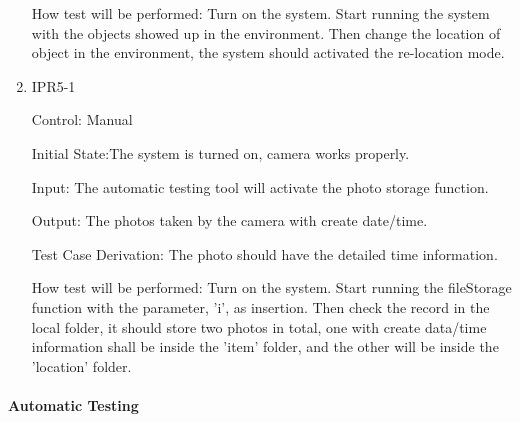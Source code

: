 \documentclass[12pt, titlepage]{article}
\begin{document}
\begin{enumerate}
How test will be performed: Turn on the system. Start running the system with the objects showed up in the environment. Then change the location of object in the environment, the system should activated the re-location mode.


\item{IPR5-1\\}

Control: Manual
					
Initial State:The system is turned on, camera works properly. 
					
Input: The automatic testing tool will activate the photo storage function. 
					
Output: The photos taken by the camera with create date/time.

Test Case Derivation: The photo should have the detailed time information.
					
How test will be performed: Turn on the system. Start running the fileStorage function with the parameter, 'i', as insertion. Then check the record in the local folder, it should store two photos in total, one with create data/time information shall be inside the 'item' folder, and the other will be inside the 'location' folder.



\end{enumerate}


\paragraph{Automatic Testing}
\end{document}
